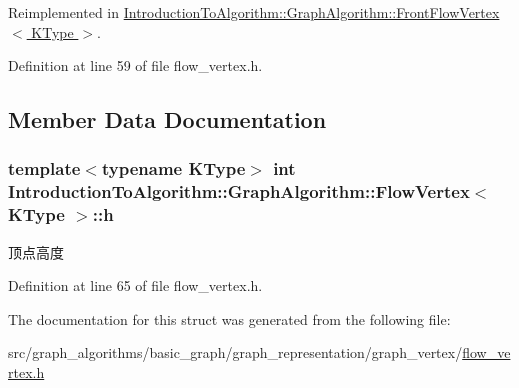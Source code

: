 Reimplemented in \hyperlink{struct_introduction_to_algorithm_1_1_graph_algorithm_1_1_front_flow_vertex_a3edfb3a6f29475f338340291ad71eab9}{Introduction\+To\+Algorithm\+::\+Graph\+Algorithm\+::\+Front\+Flow\+Vertex$<$ K\+Type $>$}.



Definition at line 59 of file flow\+\_\+vertex.\+h.



\subsection{Member Data Documentation}
\hypertarget{struct_introduction_to_algorithm_1_1_graph_algorithm_1_1_flow_vertex_a05f50003725449bbc9f4ee929c9ea87a}{}
\subsubsection[{h}]{\setlength{\rightskip}{0pt plus 5cm}template$<$typename K\+Type$>$ int {\bf Introduction\+To\+Algorithm\+::\+Graph\+Algorithm\+::\+Flow\+Vertex}$<$ K\+Type $>$\+::h}\label{struct_introduction_to_algorithm_1_1_graph_algorithm_1_1_flow_vertex_a05f50003725449bbc9f4ee929c9ea87a}
顶点高度 

Definition at line 65 of file flow\+\_\+vertex.\+h.



The documentation for this struct was generated from the following file\+:\begin{DoxyCompactItemize}
\item 
src/graph\+\_\+algorithms/basic\+\_\+graph/graph\+\_\+representation/graph\+\_\+vertex/\hyperlink{flow__vertex_8h}{flow\+\_\+vertex.\+h}\end{DoxyCompactItemize}
